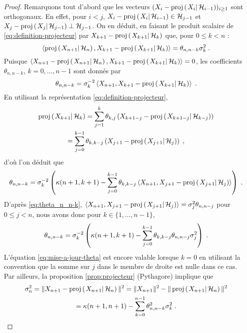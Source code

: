 \begin{proof}
Remarquons tout d'abord que les vecteurs $(X_i -
\proj{X_i}{\cH_{i-1}})_{i \geq 1}$ sont orthogonaux. En effet,
pour $i < j$, $X_i - \proj{X_i}{\cH_{i-1}} \in \cH_{j-1}$ et $X_j -
\proj{X_j}{\cH_{j-1}} \perp \cH_{j-1}$.
On en d\'eduit, en faisant le produit scalaire de
\eqref{eq:definition-projecteur} par $X_{k+1}-\proj{X_{k+1}}{\cH_k}$
que, pour $0 \leq k < n$ :
\[
\pscal{\proj{X_{n+1}}{\cH_n}}{X_{k+1}-\proj{X_{k+1}}{\cH_k}}= \theta_{n,n-k} \sigma_{k}^2 \eqsp.
\]
Puisque $\pscal{X_{n+1}-\proj{X_{n+1}}{\cH_n}}{X_{k+1}-\proj{X_{k+1}}{\cH_k}}=0$, les coefficients $\theta_{n,n-k}$,
$k=0,\dots,n-1$ sont donn\'es par
\begin{equation}\label{eq:theta_n_n-k}
\theta_{n,n-k}= \sigma_{k}^{-2} \pscal{X_{n+1}}{X_{k+1}-\proj{X_{k+1}}{\cH_k}} \eqsp.
\end{equation}
En utilisant la repr\'esentation \eqref{eq:definition-projecteur},
\begin{multline*}
\proj{X_{k+1}}{\cH_k}=\sum_{j=1}^k \theta_{k,j} \left( X_{k+1-j} -
  \proj{X_{k+1-j}}{\cH_{k-j}}\right) \\
=\sum_{j=0}^{k-1} \theta_{k,k-j} \left( X_{j+1} -
  \proj{X_{j+1}}{\cH_{j}}\right) \eqsp,
\end{multline*}
d'o\`u l'on d\'eduit que
\[
\theta_{n,n-k}= \sigma_{k}^{-2} \left( \kappa(n+1,k+1) - \sum_{j=0}^{k-1} \theta_{k,k-j} \pscal{X_{n+1}}{X_{j+1}-\proj{X_{j+1}}{\cH_j}}\right) \eqsp.
\]
D'apr\`es \eqref{eq:theta_n_n-k},
 $\pscal{X_{n+1}}{X_{j+1}-\proj{X_{j+1}}{\cH_j}}= \sigma_{j}^{2} \theta_{n,n-j}$ pour $0 \leq j < n$, nous avons donc pour
$k \in \{1,\dots,n-1\}$,
\begin{equation}
\label{eq:mise-a-jour-theta}
\theta_{n,n-k}= \sigma_{k}^{-2} \left( \kappa(n+1,k+1) - \sum_{j=0}^{k-1} \theta_{k,k-j} \theta_{n,n-j} \sigma_{j}^2 \right) \;.
\end{equation}
L'\'equation \eqref{eq:mise-a-jour-theta} est encore valable lorsque
$k=0$ en utilisant la convention que la somme sur $j$ dans le membre
de droite est nulle dans ce cas.
Par ailleurs, la proposition \ref{prop:projecteur} (Pythagore) implique que
\begin{multline}
\label{eq:mise-a-jour-sigma}
\sigma_{n}^2= \| X_{n+1} - \proj{X_{n+1}}{\cH_n} \|^2= \| X_{n+1} \|^2 - \| \proj{X_{n+1}}{\cH_n} \|^2 \\
= \kappa(n+1,n+1) - \sum_{k=0}^{n-1} \theta^2_{n,n-k} \sigma_{k}^2 \eqsp.
\end{multline}

\end{proof}

